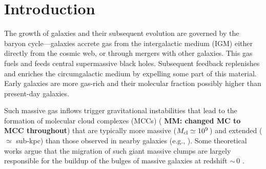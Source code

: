 \IfFileExists{emulateapjlegacy.cls}{\documentclass[iop]{emulateapjlegacy}}{\documentclass[iop]{emulateapj}}
\newcommand{\MM}[1]{({\bf \color{mmcolor} MM: #1})}
\begin{document}

\section{Introduction}
The growth of galaxies and their subsequent evolution are governed by the baryon cycle---galaxies accrete gas from the intergalactic medium (IGM) 
     either directly from the cosmic web, or through mergers with other galaxies.  This gas fuels \SF and feeds central
supermassive black holes. Subsequent feedback replenishes and enriches the circumgalactic medium 
   by expelling some
part of this material. 
    Early
galaxies 
are more gas-rich and their molecular fraction possibly higher 
   than
present-day galaxies.

Such massive gas inflows trigger gravitational instabilities that lead to the formation of molecular 
   cloud complexes (MCCs)  \MM{changed MC to MCC throughout}
that are typically more massive ($M_{\rm cl}\simeq 10^9$\,\Msun) and extended ($\simeq$ sub-kpc) than those observed in nearby galaxies (e.g., \citealt{Gabor13a, Hopkins14a, Inoue16a}).
%
Some theoretical works argue that the migration of such giant massive clumps are largely responsible for the buildup of the bulges of massive galaxies at redshift \z$\sim$\,0 \citep[e.g.,][]{Ceverino10a}.
\end{document}
